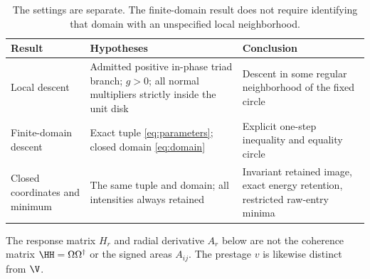 \begin{table}[htbp]
\centering\small
\caption{The settings are separate. The finite-domain result does not require identifying that domain with an unspecified local neighborhood.}\label{tab:settings}
\begin{tabularx}{\textwidth}{@{}>{\raggedright\arraybackslash}p{}YY@{}}
\toprule
Result & Hypotheses & Conclusion\\\midrule
Local descent & Admitted positive in-phase triad branch; \(g>0\); all normal multipliers strictly inside the unit disk & Descent in some regular neighborhood of the fixed circle\\
Finite-domain descent & Exact tuple \eqref{eq:parameters}; closed domain \eqref{eq:domain} & Explicit one-step inequality and equality circle\\
Closed coordinates and minimum & The same tuple and domain; all intensities always retained & Invariant retained image, exact energy retention, restricted raw-entry minima\\
\bottomrule
\end{tabularx}
\end{table}

The response matrix \(H_r\) and radial derivative \(A_r\) below are not the coherence matrix \(\HH=\Omega\Omega^\dagger\) or the signed areas \(A_{ij}\). The prestage \(v\) is likewise distinct from \(\V\).
